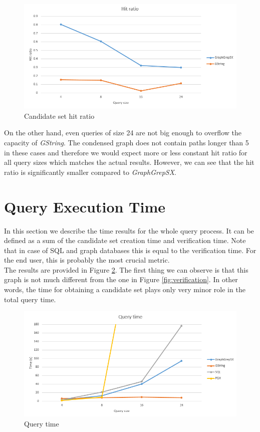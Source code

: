 \begin{figure}[h]
	\centering
	\includegraphics[width=1\textwidth]{../img/hitRatio.png}
	\caption{Candidate set hit ratio}
	\label{fig:hitratio}
\end{figure}

On the other hand, even queries of size 24 are not big enough to overflow the capacity of \textit{GString}. The condensed graph does not contain paths longer than 5 in these cases and therefore we would expect more or less constant hit ratio for all query sizes which matches the actual results. However, we can see that the hit ratio is significantly smaller compared to \textit{GraphGrepSX}.

\section{Query Execution Time}
In this section we describe the time results for the whole query process. It can be defined as a sum of the candidate set creation time and verification time. Note that in case of SQL and graph databases this is equal to the verification time. For the end user, this is probably the most crucial metric.\\

The results are provided in Figure \ref{fig:querytime}. The first thing we can observe is that this graph is not much different from the one in Figure \ref{fig:verification}. In other words, the time for obtaining a candidate set plays only very minor role in the total query time.\\

\begin{figure}[h]
	\centering
	\includegraphics[width=1\textwidth]{../img/queryTime.png}
	\caption{Query time}
	\label{fig:querytime}
\end{figure}

